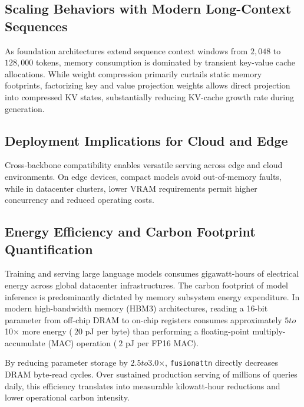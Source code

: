 \subsection{Scaling Behaviors with Modern Long-Context Sequences}
As foundation architectures extend sequence context windows from $2{,}048$ to $128{,}000$ tokens, memory consumption is dominated by transient key-value cache allocations. While weight compression primarily curtails static memory footprints, factorizing key and value projection weights allows direct projection into compressed KV states, substantially reducing KV-cache growth rate during generation.

\subsection{Deployment Implications for Cloud and Edge}
Cross-backbone compatibility enables versatile serving across edge and cloud environments. On edge devices, compact models avoid out-of-memory faults, while in datacenter clusters, lower VRAM requirements permit higher concurrency and reduced operating costs.

\subsection{Energy Efficiency and Carbon Footprint Quantification}
Training and serving large language models consumes gigawatt-hours of electrical energy across global datacenter infrastructures. The carbon footprint of model inference is predominantly dictated by memory subsystem energy expenditure. In modern high-bandwidth memory (HBM3) architectures, reading a 16-bit parameter from off-chip DRAM to on-chip registers consumes approximately $5$\times$ to $10$\times$ more energy ($~20$ pJ per byte) than performing a floating-point multiply-accumulate (MAC) operation ($~2$ pJ per FP16 MAC).

By reducing parameter storage by $2.5$\times$ to $3.0$\times$, \texttt{fusionattn} directly decreases DRAM byte-read cycles. Over sustained production serving of millions of queries daily, this efficiency translates into measurable kilowatt-hour reductions and lower operational carbon intensity.
